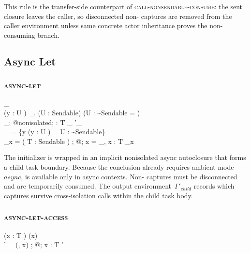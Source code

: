 This rule is the transfer-side counterpart of \textsc{call-nonsendable-consume}: the sent closure leaves the caller, so disconnected non- captures are removed from the caller environment unless same concrete actor inheritance proves the non-consuming branch.

\subsection{Async Let}

\subsubsection{\textsc{async-let}}

  {\Gamma_{} \subseteq \Gamma \\
   \forall (y : U \at \rho) \in \Gamma_{}.\; (U : \textsf{Sendable}) \lor (U : {\sim}\textsf{Sendable} \land \rho = \disconnected) \\
   \Gamma_{};\; @\textsf{nonisolated};\;  \vdash {} : T \at \rho_{} \dashv \Gamma'_{} \\
   \Gamma_{} = \Gamma \setminus \{y \mid (y : U \at \disconnected) \in \Gamma_{} \land U : {\sim}\textsf{Sendable}\} \\
   \rho_x = ( T : \textsf{Sendable}  \mathunderscore {} \disconnected)}
  {\Gamma;\; @\kappa;\;  \vdash {}\; x =  \dashv \Gamma_{},\; x : T \at \rho_x}

The initializer is wrapped in an implicit nonisolated async autoclosure that forms a child task boundary. Because the conclusion already requires ambient mode~$\mathit{async}$,  is available only in async contexts. Non- captures must be disconnected and are temporarily consumed. The output environment~$\Gamma'_{\mathit{child}}$ records which captures survive cross-isolation calls within the child task body.

\subsubsection{\textsc{async-let-access}}

  {(x : T \at \rho) \in \Gamma \quad \isAsyncLet(x) \\
   \Gamma' = \undosend(\Gamma, x)}
  {\Gamma;\; @\kappa;\;  \vdash {}\; x : T \at \rho \dashv \Gamma'}

